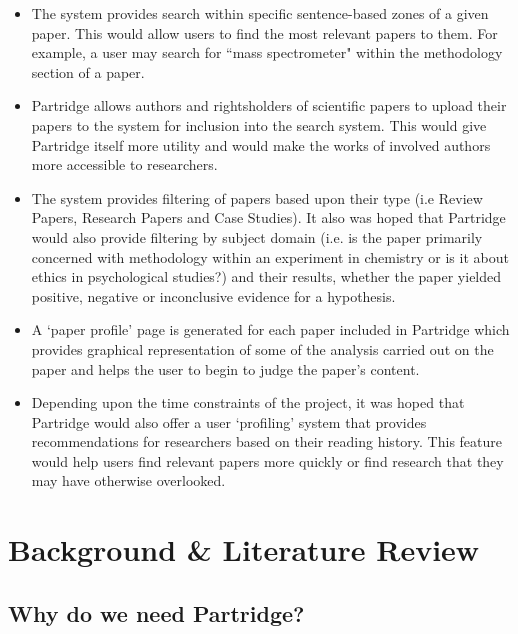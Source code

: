 \begin{itemize}
\item The system provides search within specific sentence-based zones of a given
paper. This would allow users to find the most relevant papers to them. For
example, a user may search for ``mass spectrometer" within the methodology
section of a paper.
\item Partridge allows authors and rightsholders of scientific papers to
upload their papers to the system for inclusion into the search system. This
would give Partridge itself more utility and would make the works of involved authors more
accessible to researchers.
\item The system provides filtering of papers based upon their type (i.e Review
Papers, Research Papers and Case Studies). It also was hoped that Partridge would
also provide filtering by subject domain (i.e. is the paper primarily concerned with methodology within
an experiment in chemistry or is it about ethics in psychological studies?) and
their results, whether the paper yielded positive, negative or inconclusive
evidence for a hypothesis. 
\item A `paper profile' page is generated for each paper included in Partridge
which provides graphical representation of some of the analysis carried out on
the paper and helps the user to begin to judge the paper's content.
\item Depending upon the time constraints of the
project, it was hoped that Partridge would also offer a user `profiling' system
that provides recommendations for researchers based on their reading history.
This feature would help users find relevant papers more quickly or find
research that they may have otherwise overlooked.
\end{itemize}

\section{Background \& Literature Review}

\subsection{ Why do we need Partridge? }

